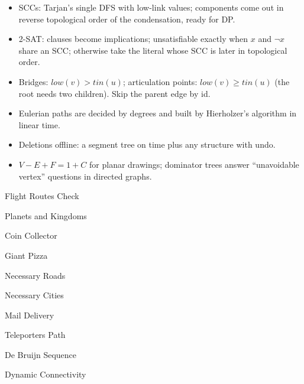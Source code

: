 \begin{summary}
\begin{itemize}
  \item SCCs: Tarjan's single DFS with low-link values; components come out in reverse topological order of the condensation,
        ready for DP.
  \item 2-SAT: clauses become implications; unsatisfiable exactly when $x$ and $\lnot x$ share an SCC; otherwise take the literal
        whose SCC is later in topological order.
  \item Bridges: $\mathit{low}(v) > \mathit{tin}(u)$; articulation points: $\mathit{low}(v) \ge \mathit{tin}(u)$ (the root needs
        two children). Skip the parent edge by id.
  \item Eulerian paths are decided by degrees and built by Hierholzer's algorithm in linear time.
  \item Deletions offline: a segment tree on time plus any structure with undo.
  \item $V - E + F = 1 + C$ for planar drawings; dominator trees answer ``unavoidable vertex'' questions in directed graphs.
\end{itemize}
\end{summary}

\begin{practice}
\begin{pplist}
  \item Flight Routes Check
  \item Planets and Kingdoms
  \item Coin Collector
  \item Giant Pizza
\end{pplist}
\begin{pplist}
  \item Necessary Roads
  \item Necessary Cities
  \item Mail Delivery
  \item Teleporters Path
  \item De Bruijn Sequence
  \item Dynamic Connectivity
\end{pplist}
\end{practice}

